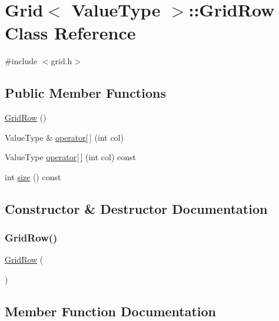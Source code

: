 \hypertarget{classGrid_1_1GridRow}{}\section{Grid$<$ Value\+Type $>$\+:\+:Grid\+Row Class Reference}
\label{classGrid_1_1GridRow}


{\ttfamily \#include $<$grid.\+h$>$}

\subsection*{Public Member Functions}
\begin{DoxyCompactItemize}
\item 
\mbox{\hyperlink{classGrid_1_1GridRow_aecbb8a1354a4b8ccf4764c1ba3d81896}{Grid\+Row}} ()
\item 
Value\+Type \& \mbox{\hyperlink{classGrid_1_1GridRow_a8bb588385a542bce972f4d3ce343744c}{operator\mbox{[}$\,$\mbox{]}}} (int col)
\item 
Value\+Type \mbox{\hyperlink{classGrid_1_1GridRow_afab07128e7554bce80de308f62fb07db}{operator\mbox{[}$\,$\mbox{]}}} (int col) const
\item 
int \mbox{\hyperlink{classGrid_1_1GridRow_af9593d4a5ff4274efaf429cb4f9e57cc}{size}} () const
\end{DoxyCompactItemize}


\subsection{Constructor \& Destructor Documentation}
\mbox{\label{classGrid_1_1GridRow_aecbb8a1354a4b8ccf4764c1ba3d81896}} 
\subsubsection{\texorpdfstring{Grid\+Row()}{GridRow()}}
{\footnotesize\ttfamily \mbox{\hyperlink{classGrid_1_1GridRow}{Grid\+Row}} (\begin{DoxyParamCaption}{ }\end{DoxyParamCaption})\hspace{0.3cm}{\ttfamily [inline]}}



\subsection{Member Function Documentation}
\mbox{\label{classGrid_1_1GridRow_a8bb588385a542bce972f4d3ce343744c}} 
